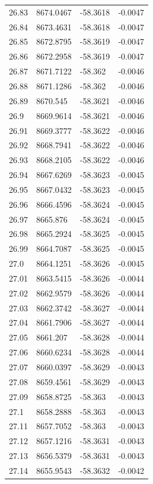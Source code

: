 \begin{table}[H]
\begin{tabular}{llll}
26.83 & 8674.0467 & -58.3618 & -0.0047 \\
26.84 & 8673.4631 & -58.3618 & -0.0047 \\
26.85 & 8672.8795 & -58.3619 & -0.0047 \\
26.86 & 8672.2958 & -58.3619 & -0.0047 \\
26.87 & 8671.7122 & -58.362 & -0.0046 \\
26.88 & 8671.1286 & -58.362 & -0.0046 \\
26.89 & 8670.545 & -58.3621 & -0.0046 \\
26.9 & 8669.9614 & -58.3621 & -0.0046 \\
26.91 & 8669.3777 & -58.3622 & -0.0046 \\
26.92 & 8668.7941 & -58.3622 & -0.0046 \\
26.93 & 8668.2105 & -58.3622 & -0.0046 \\
26.94 & 8667.6269 & -58.3623 & -0.0045 \\
26.95 & 8667.0432 & -58.3623 & -0.0045 \\
26.96 & 8666.4596 & -58.3624 & -0.0045 \\
26.97 & 8665.876 & -58.3624 & -0.0045 \\
26.98 & 8665.2924 & -58.3625 & -0.0045 \\
26.99 & 8664.7087 & -58.3625 & -0.0045 \\
27.0 & 8664.1251 & -58.3626 & -0.0045 \\
27.01 & 8663.5415 & -58.3626 & -0.0044 \\
27.02 & 8662.9579 & -58.3626 & -0.0044 \\
27.03 & 8662.3742 & -58.3627 & -0.0044 \\
27.04 & 8661.7906 & -58.3627 & -0.0044 \\
27.05 & 8661.207 & -58.3628 & -0.0044 \\
27.06 & 8660.6234 & -58.3628 & -0.0044 \\
27.07 & 8660.0397 & -58.3629 & -0.0043 \\
27.08 & 8659.4561 & -58.3629 & -0.0043 \\
27.09 & 8658.8725 & -58.363 & -0.0043 \\
27.1 & 8658.2888 & -58.363 & -0.0043 \\
27.11 & 8657.7052 & -58.363 & -0.0043 \\
27.12 & 8657.1216 & -58.3631 & -0.0043 \\
27.13 & 8656.5379 & -58.3631 & -0.0043 \\
27.14 & 8655.9543 & -58.3632 & -0.0042 \\

\end{tabular}
\end{table}
